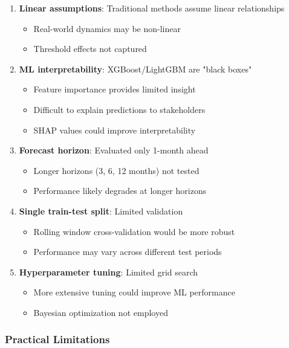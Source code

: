 \documentclass[12pt]{article}
\begin{document}
\begin{enumerate}
    \item \textbf{Linear assumptions}: Traditional methods assume linear relationships
    \begin{itemize}
        \item Real-world dynamics may be non-linear
        \item Threshold effects not captured
    \end{itemize}

    \item \textbf{ML interpretability}: XGBoost/LightGBM are "black boxes"
    \begin{itemize}
        \item Feature importance provides limited insight
        \item Difficult to explain predictions to stakeholders
        \item SHAP values could improve interpretability
    \end{itemize}

    \item \textbf{Forecast horizon}: Evaluated only 1-month ahead
    \begin{itemize}
        \item Longer horizons (3, 6, 12 months) not tested
        \item Performance likely degrades at longer horizons
    \end{itemize}

    \item \textbf{Single train-test split}: Limited validation
    \begin{itemize}
        \item Rolling window cross-validation would be more robust
        \item Performance may vary across different test periods
    \end{itemize}

    \item \textbf{Hyperparameter tuning}: Limited grid search
    \begin{itemize}
        \item More extensive tuning could improve ML performance
        \item Bayesian optimization not employed
    \end{itemize}
\end{enumerate}

\subsubsection*{Practical Limitations}
\end{document}

